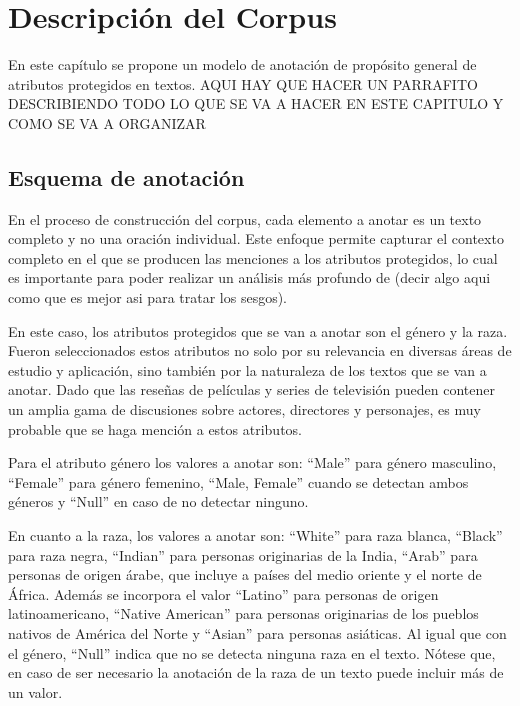 \chapter{Descripci\'on del Corpus}\label{chapter:proposal}
En este cap\'itulo se propone un modelo de anotaci\'on de prop\'osito general de atributos protegidos
en textos. 
AQUI HAY QUE HACER UN PARRAFITO DESCRIBIENDO TODO LO QUE SE VA A HACER EN ESTE CAPITULO Y COMO SE VA A ORGANIZAR

\section{Esquema de anotaci\'on}\label{section:annotation_scheme}
En el proceso de construcci\'on del corpus, cada elemento a anotar es un texto completo y no una oraci\'on individual. 
Este enfoque permite capturar el contexto completo en el que se producen las menciones a los atributos protegidos, 
lo cual es importante para poder realizar un an\'alisis m\'as profundo de (decir algo aqui como que es mejor asi para tratar los sesgos).

En este caso, los atributos protegidos que se van a anotar son el g\'enero y la raza.
Fueron seleccionados estos atributos no solo por su relevancia en diversas \'areas de estudio y aplicaci\'on, sino tambi\'en 
por la naturaleza de los textos que se van a anotar. Dado que las rese\~nas de pel\'iculas y series de televisi\'on
pueden contener un amplia gama de discusiones sobre actores, directores y personajes, es muy probable que se haga menci\'on a 
estos atributos.

Para el atributo g\'enero los valores a anotar son: ``Male'' para g\'enero masculino, ``Female'' para g\'enero femenino, 
``Male, Female'' cuando se detectan ambos g\'eneros y ``Null'' en caso de no detectar ninguno.

En cuanto a la raza, los valores a anotar son: ``White'' para raza blanca, ``Black'' para raza negra, ``Indian'' para 
personas originarias de la India, ``Arab'' para personas de origen \'arabe, que incluye a pa\'ises del medio oriente y el norte de 
\'Africa. Adem\'as se incorpora el valor ``Latino'' para personas de origen latinoamericano, ``Native American'' para personas 
originarias de los pueblos nativos de Am\'erica del Norte y ``Asian'' para personas asi\'aticas. Al igual que con el g\'enero, 
``Null'' indica que no se detecta ninguna raza en el texto. N\'otese que, en caso de ser necesario la anotaci\'on de la raza de un 
texto puede incluir m\'as de un valor.

